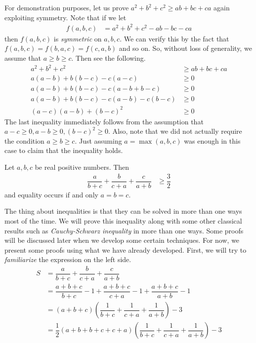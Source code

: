 \documentclass{subfile}
\begin{document}
	For demonstration purposes, let us prove $a^2+b^2+c^2\geq ab+bc+ca$ again exploiting symmetry. Note that if we let
		\begin{align*}
			f(a,b,c)
				& = a^2+b^2+c^2-ab-bc-ca
		\end{align*}
	then $f(a,b,c)$ is \emph{symmetric} on $a,b,c$. We can verify this by the fact that $f(a,b,c)=f(b,a,c)=f(c,a,b)$ and so on. So, without loss of generality, we assume that $a\geq b\geq c$. Then see the following.
		\begin{align*}
			a^2+b^2+c^2
				& \geq ab+bc+ca\\
			a(a-b)+b(b-c)-c(a-c)
				& \geq0\\
			a(a-b)+b(b-c)-c(a-b+b-c)
				& \geq0\\
			a(a-b)+b(b-c)-c(a-b)-c(b-c)
				& \geq0\\
			(a-c)(a-b)+(b-c)^2
				& \geq0
		\end{align*}
	The last inequality immediately follows from the assumption that $a-c\geq0,a-b\geq0,(b-c)^2\geq0$. Also, note that we did not actually require the condition $a\geq b\geq c$. Just assuming $a=\max(a,b,c)$ was enough in this case to claim that the inequality holds. 
		\begin{theorem}\label{thm:nesbitt}
			Let $a,b,c$ be real positive numbers. Then
				\begin{align*}
					\dfrac{a}{b+c}+\dfrac{b}{c+a}+\dfrac{c}{a+b}
						& \geq\dfrac{3}{2}
				\end{align*}
			and equality occurs if and only $a=b=c$.
		\end{theorem}
	The thing about inequalities is that they can be solved in more than one ways most of the time. We will  prove this inequality along with some other classical results such as \emph{Cauchy-Schwarz inequality} in more than one ways. Some proofs will be discussed later when we develop some certain techniques. For now, we present some proofs using what we have already developed.
	First, we will try to \emph{familiarize} the expression on the left side.
		\begin{align}
			S
				& = \dfrac{a}{b+c}+\dfrac{b}{c+a}+\dfrac{c}{a+b}\nonumber\\
				& = \dfrac{a+b+c}{b+c}-1+\dfrac{a+b+c}{c+a}-1+\dfrac{a+b+c}{a+b}-1\nonumber\\
				& = (a+b+c)\left(\dfrac{1}{b+c}+\dfrac{1}{c+a}+\dfrac{1}{a+b}\right)-3\nonumber\\
				& = \dfrac{1}{2}(a+b+b+c+c+a)\left(\dfrac{1}{b+c}+\dfrac{1}{c+a}+\dfrac{1}{a+b}\right)-3\label{eqn:nesbittf}
		\end{align}
	
\end{document}
